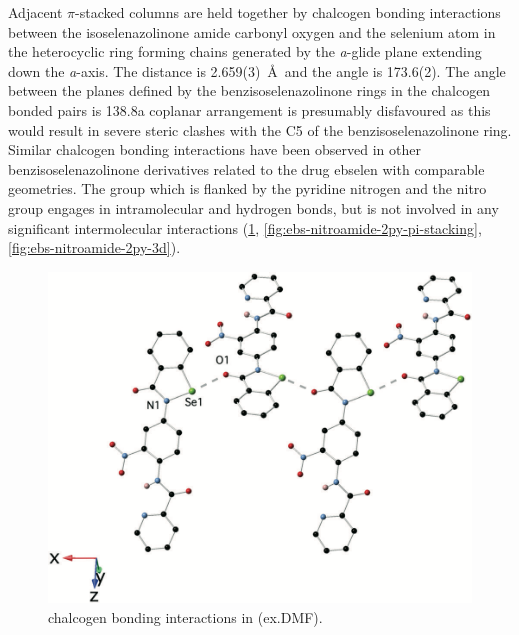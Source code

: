 Adjacent $\pi$-stacked columns are held together by chalcogen bonding interactions between the isoselenazolinone amide carbonyl oxygen and the selenium atom in the heterocyclic ring forming chains generated by the \emph{a}-glide plane extending down the \emph{a}-axis.
The  distance is 2.659(3)~\AA~and the  angle is 173.6(2)\degree.
The angle between the planes defined by the benzisoselenazolinone rings in the chalcogen bonded pairs is 138.8\degree a coplanar arrangement is presumably disfavoured as this would result in severe steric clashes with the C5 of the benzisoselenazolinone ring. 
Similar  chalcogen bonding interactions have been observed in other benzisoselenazolinone derivatives related to the drug ebselen with comparable geometries.\autocite{Fellowes2019,Thomas2015,Bhabak2007,Piatek1995} 
The  group which is flanked by the pyridine nitrogen and the nitro group engages in intramolecular  and  hydrogen bonds, but is not involved in any significant intermolecular interactions (\ref{fig:ebs-nitroamide-2py-o-se}, \ref{fig:ebs-nitroamide-2py-pi-stacking}, \ref{fig:ebs-nitroamide-2py-3d}).

\begin{figure}
    \centering
    \includegraphics[width=0.8\linewidth]{Figures/ebs-nitroamide-2py-o-se.png}
    \caption{ chalcogen bonding interactions in (ex.DMF).}
    \label{fig:ebs-nitroamide-2py-o-se}
\end{figure}

